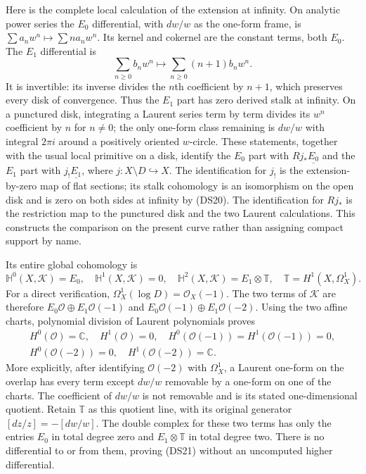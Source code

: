 Here is the complete local calculation of the extension at infinity.
On analytic power series the $E_0$ differential, with $dw/w$ as the
one-form frame, is
$\sum a_nw^n\mapsto\sum n a_nw^n$.  Its kernel and cokernel are
the constant terms, both $E_0$.  The $E_1$ differential is
\[
 \sum_{n\geq0}b_nw^n\longmapsto
 \sum_{n\geq0}(n+1)b_nw^n.
 \tag{DS20}
\]
It is invertible: its inverse divides the $n$th coefficient by $n+1$,
which preserves every disk of convergence.  Thus the $E_1$ part has
zero derived stalk at infinity.  On a punctured disk, integrating a
Laurent series term by term divides its $w^n$ coefficient by $n$ for
$n\ne0$; the only one-form class remaining is $dw/w$ with integral
$2\pi i$ around a positively oriented $w$-circle.  These statements,
together with the usual local primitive on a disk, identify the
$E_0$ part with $Rj_*\underline{E_0}$ and the $E_1$ part with
$j_!\underline{E_1}$, where $j:X\setminus D\hookrightarrow X$.
The identification for $j_!$ is the extension-by-zero map of flat
sections; its stalk cohomology is an isomorphism on the open disk and
is zero on both sides at infinity by (DS20).  The identification for
$Rj_*$ is the restriction map to the punctured disk and the two
Laurent calculations.  This constructs the comparison on the present
curve rather than assigning compact support by name.

Its entire global cohomology is
\[
 \mathbb H^0(X,\mathscr K)=E_0,\quad
 \mathbb H^1(X,\mathscr K)=0,\quad
 \mathbb H^2(X,\mathscr K)=E_1\otimes\mathbb T,
 \quad\mathbb T=H^1(X,\Omega_X^1).
 \tag{DS21}
\]
For a direct verification, $\Omega_X^1(\log D)=\mathcal O_X(-1)$.
The two terms of $\mathscr K$ are therefore
$E_0\mathcal O\oplus E_1\mathcal O(-1)$ and
$E_0\mathcal O(-1)\oplus E_1\mathcal O(-2)$.
Using the two affine charts, polynomial division of Laurent
polynomials proves
\[
 \begin{gathered}
 H^0(\mathcal O)=\mathbb C,\quad H^1(\mathcal O)=0,
 \quad H^0(\mathcal O(-1))=H^1(\mathcal O(-1))=0,\\
 H^0(\mathcal O(-2))=0,\quad H^1(\mathcal O(-2))=\mathbb C.
 \end{gathered}
 \tag{DS22}
\]
More explicitly, after identifying $\mathcal O(-2)$ with
$\Omega_X^1$, a Laurent one-form on the overlap has every term
except $dw/w$ removable by a one-form on one of the charts.
The coefficient of $dw/w$ is not removable and is its stated
one-dimensional quotient. Retain $\mathbb T$ as this quotient line, with
its original generator $[dz/z]=-[dw/w]$.  The double complex for these two terms
has only the entries $E_0$ in total degree zero and $E_1\otimes\mathbb T$ in total
degree two.  There is no differential to or from them, proving
(DS21) without an uncomputed higher differential.

